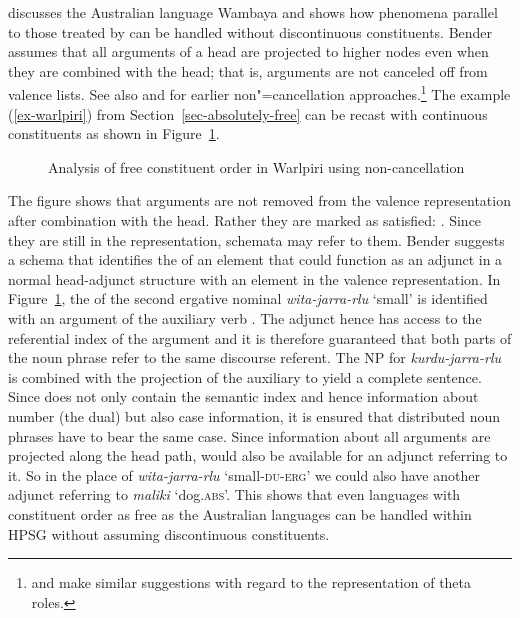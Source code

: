 \documentclass[output=paper]{langsci/langscibook}
\begin{document}
\citet{Bender2008a} discusses the Australian language Wambaya and shows how phenomena parallel to
those treated by \citet{DS99a} can be handled without discontinuous constituents.
Bender assumes that all arguments of a head are projected to higher nodes even when they are
combined with the head; that is, arguments are not canceled off from valence lists. See also  and
 for earlier non"=cancellation approaches.\footnote{
 and  make similar suggestions with regard to the
representation of theta roles.%
} The example (\ref{ex-warlpiri}) from
Section~\ref{sec-absolutely-free} can be recast with continuous constituents as shown in
Figure~\ref{fig-warlpiri-non-cancellation}. 
\begin{figure}
\caption{\label{fig-warlpiri-non-cancellation}Analysis of free constituent order in Warlpiri using non-cancellation}
\end{figure}
The figure shows that arguments are not removed from the valence representation after combination
with the head. Rather they are marked as satisfied: . Since they are still in the representation,
schemata may refer to them. Bender suggests a schema that identifies the \modv of an element that
could function as an adjunct in a normal head-adjunct structure with an element in the valence
representation. In Figure~\ref{fig-warlpiri-non-cancellation}, the \modv of the second ergative
nominal \emph{wita-jarra-rlu} `small' is identified with an argument of the auxiliary verb . The
adjunct hence has access to the referential index of the argument and it is therefore guaranteed
that both parts of the noun phrase refer to the same discourse referent. The NP for
\emph{kurdu-jarra-rlu} is combined with the projection of the auxiliary to yield a complete
sentence. Since  does not only contain the semantic index and hence information about number
(the dual) but also case information, it is ensured that distributed noun phrases have to bear the
same case. Since information about all arguments are projected along the head path,  would
also be available for an adjunct referring to it. So in the place of \emph{wita-jarra-rlu}
`small-\textsc{du}-\textsc{erg}' we could also have another adjunct referring to \emph{maliki}
`dog.\textsc{abs}'. This shows that even languages with constituent order as free as the Australian
languages can be handled within HPSG without assuming discontinuous constituents.
\end{document}

